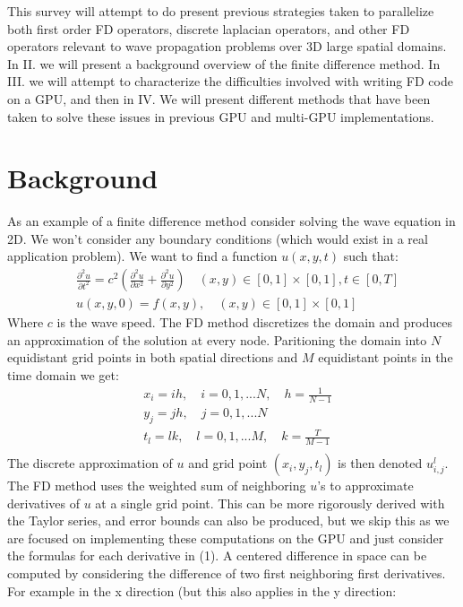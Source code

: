 \documentclass[conference]{IEEEtran}
\begin{document}
This survey will attempt to do present previous strategies taken to parallelize both first order FD operators, discrete laplacian operators, and other FD operators relevant to wave propagation problems over 3D large spatial domains. In II. we will present a background overview of the finite difference method. In III. we will attempt to characterize the difficulties involved with writing FD code on a GPU, and then in IV. We will present different methods that have been taken to solve these issues in previous GPU and multi-GPU implementations.

\section{Background}

As an example of a finite difference method consider solving the wave equation in 2D. We won't consider any boundary conditions (which would exist in a real application problem). We want to find a function $u(x, y, t)$ such that:
\begin{align}
&\frac{\partial^2 u}{\partial t^2} = c^2\left(\frac{\partial^2u}{\partial x^2} + \frac{\partial^2 u}{\partial y^2}\right) \quad (x,y) \in [0, 1] \times [0,1], t \in [0,T]\\
&u(x, y, 0) = f(x,y), \quad (x,y) \in [0, 1] \times [0,1]
\end{align}
Where $c$ is the wave speed. The FD method discretizes the domain and produces an approximation of the solution at every node. Paritioning the domain into $N$ equidistant grid points in both spatial directions and $M$ equidistant points in the time domain we get:
\begin{align*}
&x_i = ih, \quad i = 0,1,...N, \quad h = \frac{1}{N-1}\\
&y_j = jh, \quad j = 0,1,...N\\
&t_l = lk, \quad l = 0,1,...M, \quad k = \frac{T}{M-1}\\
\end{align*}
The discrete approximation of $u$ and grid point $(x_i, y_j, t_l)$ is then denoted $u^l_{i,j}$. The FD method uses the weighted sum of neighboring $u$'s to approximate derivatives of $u$ at a single grid point. This can be more rigorously derived with the Taylor series, and error bounds can also be produced, but we skip this as we are focused on implementing these computations on the GPU and just consider the formulas for each derivative in (1). A centered difference in space can be computed by considering the difference of two first neighboring first derivatives. For example in the x direction (but this also applies in the y direction:
\end{document}
